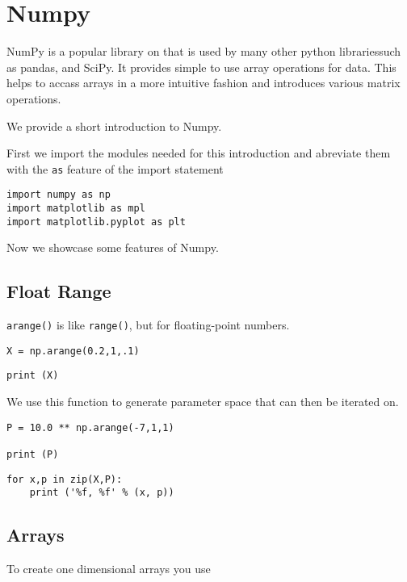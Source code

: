 \chapter{Numpy}\label{c:numpy}

NumPy is a popular library on that is used by many other python
librariessuch as pandas, and SciPy. It provides simple to use array
operations for data. This helps to accass arrays in a more intuitive
fashion and introduces various matrix operations.

We provide a short introduction to Numpy.

First we import the modules needed for this introduction and abreviate
them with the \texttt{as} feature of the import statement

\begin{verbatim}
import numpy as np
import matplotlib as mpl
import matplotlib.pyplot as plt
\end{verbatim}

Now we showcase some features of Numpy.

\section{Float Range}\label{float-range}

\texttt{arange()} is like \texttt{range()}, but for floating-point
numbers.

\begin{verbatim}
X = np.arange(0.2,1,.1)
\end{verbatim}

\begin{verbatim}
print (X)
\end{verbatim}

We use this function to generate parameter space that can then be
iterated on.

\begin{verbatim}
P = 10.0 ** np.arange(-7,1,1)

print (P)
\end{verbatim}

\begin{verbatim}
for x,p in zip(X,P):
    print ('%f, %f' % (x, p))
\end{verbatim}

\section{Arrays}\label{arrays}

To create one dimensional arrays you use

